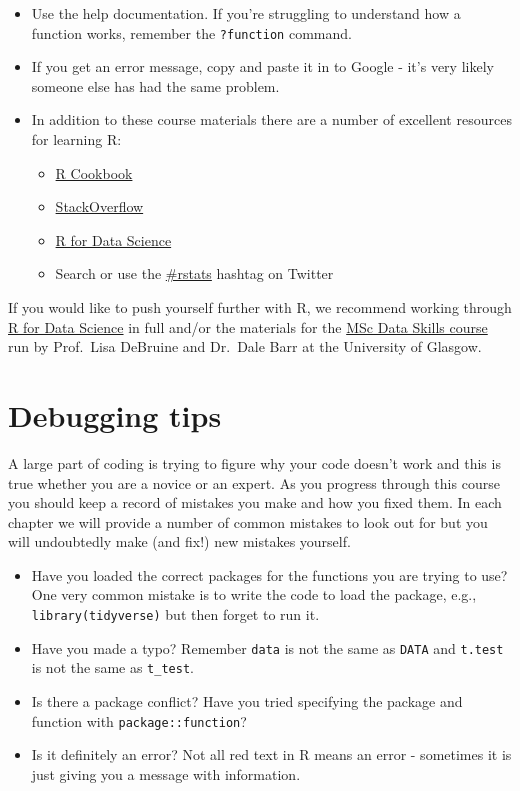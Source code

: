 \documentclass[]{book}
\providecommand{\tightlist}{%
  \setlength{\itemsep}{0pt}\setlength{\parskip}{0pt}}
\begin{document}
\begin{itemize}
\tightlist
\item
  Use the help documentation. If you're struggling to understand how a function works, remember the \texttt{?function} command.
\item
  If you get an error message, copy and paste it in to Google - it's very likely someone else has had the same problem.
\item
  In addition to these course materials there are a number of excellent resources for learning R:

  \begin{itemize}
  \tightlist
  \item
    \href{http://www.cookbook-r.com/}{R Cookbook}
  \item
    \href{https://stackoverflow.com/}{StackOverflow}
  \item
    \href{https://r4ds.had.co.nz/}{R for Data Science}
  \item
    Search or use the \href{https://twitter.com/search?f=tweets\&q=\%23rstats\&src=typd}{\#rstats} hashtag on Twitter
  \end{itemize}
\end{itemize}

If you would like to push yourself further with R, we recommend working through \href{https://r4ds.had.co.nz/}{R for Data Science} in full and/or the materials for the \href{https://gupsych.github.io/data_skills/}{MSc Data Skills course} run by Prof.~Lisa DeBruine and Dr.~Dale Barr at the University of Glasgow.

\hypertarget{debugging-tips}{%
\section{Debugging tips}\label{debugging-tips}}

A large part of coding is trying to figure why your code doesn't work and this is true whether you are a novice or an expert. As you progress through this course you should keep a record of mistakes you make and how you fixed them. In each chapter we will provide a number of common mistakes to look out for but you will undoubtedly make (and fix!) new mistakes yourself.

\begin{itemize}
\tightlist
\item
  Have you loaded the correct packages for the functions you are trying to use? One very common mistake is to write the code to load the package, e.g., \texttt{library(tidyverse)} but then forget to run it.
\item
  Have you made a typo? Remember \texttt{data} is not the same as \texttt{DATA} and \texttt{t.test} is not the same as \texttt{t\_test}.
\item
  Is there a package conflict? Have you tried specifying the package and function with \texttt{package::function}?
\item
  Is it definitely an error? Not all red text in R means an error - sometimes it is just giving you a message with information.
\end{itemize}
\end{document}
